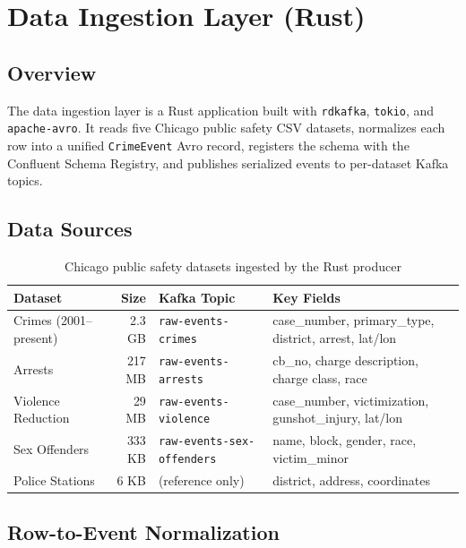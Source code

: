 \documentclass[12pt,a4paper]{article}
\begin{document}
\section{Data Ingestion Layer (Rust)}

\subsection{Overview}

The data ingestion layer is a Rust application built with \texttt{rdkafka}, \texttt{tokio}, and \texttt{apache-avro}. It reads five Chicago public safety CSV datasets, normalizes each row into a unified \texttt{CrimeEvent} Avro record, registers the schema with the Confluent Schema Registry, and publishes serialized events to per-dataset Kafka topics.

\subsection{Data Sources}

\begin{table}[H]
\centering
\caption{Chicago public safety datasets ingested by the Rust producer}
\label{tab:datasets}
\begin{tabularx}{\textwidth}{l r l X}
\toprule
\textbf{Dataset} & \textbf{Size} & \textbf{Kafka Topic} & \textbf{Key Fields} \\
\midrule
Crimes (2001--present) & 2.3 GB & \texttt{raw-events-crimes} & case\_number, primary\_type, district, arrest, lat/lon \\
Arrests & 217 MB & \texttt{raw-events-arrests} & cb\_no, charge description, charge class, race \\
Violence Reduction & 29 MB & \texttt{raw-events-violence} & case\_number, victimization, gunshot\_injury, lat/lon \\
Sex Offenders & 333 KB & \texttt{raw-events-sex-offenders} & name, block, gender, race, victim\_minor \\
Police Stations & 6 KB & (reference only) & district, address, coordinates \\
\bottomrule
\end{tabularx}
\end{table}

\subsection{Row-to-Event Normalization}
\end{document}
